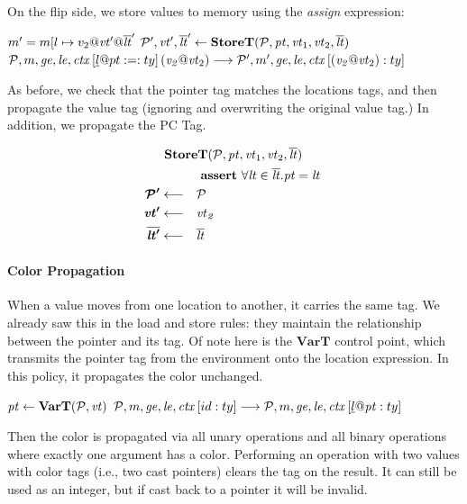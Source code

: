 \documentclass{article}
\begin{document}
On the flip side, we store values to memory using the {\it assign} expression:

                  {\(m' = m[l \mapsto v_2@\mathit{vt}' @\overline{\mathit{lt}}'\)}
                  {\(\mathcal{P}',\mathit{vt}',\overline{\mathit{lt}}' \leftarrow \mathbf{StoreT}(\mathcal{P},\mathit{pt},\mathit{vt}_1,\mathit{vt}_2,\overline{\mathit{lt}})\)}
                  {\(\mathcal{P}, m, \mathit{ge}, \mathit{le}, \mathit{ctx}\left[\underline{l}@pt := : ty\right]{(\mathit{v_2} @ \mathit{vt}_2)}
                    \longrightarrow
                    \mathcal{P}', m', \mathit{ge}, \mathit{le}, \mathit{ctx}\left[(\mathit{v_2} @ \mathit{vt}_2) : ty\right]\)}

As before, we check that the pointer tag matches the locations tags, and then propagate the
value tag (ignoring and overwriting the original value tag.) In addition, we propagate the PC Tag.
                  
\[\begin{aligned}
\truledef{\storet{\PCT}{\pt}{\vt_1}{\vt_2}{\overline{\lt}}}
\assert{\forall \lt \in \overline{\lt} . \pt = \lt}
\settag{\PCT'}{\PCT}
\settag{\vt'}{\vt_2}
\settag{\overline{\lt'}}{\overline{\lt}}
\end{aligned}\]

\paragraph*{Color Propagation}

When a value moves from one location to another, it carries the same tag.
We already saw this in the load and store rules: they maintain the relationship
between the pointer and its tag. Of note here is the \(\mathbf{VarT}\) control point,
which transmits the pointer tag from the environment onto the location expression.
In this policy, it propagates the color unchanged.

            {\(\mathit{pt} \leftarrow \mathbf{VarT}(\mathcal{P},\mathit{vt})\)}
            {\(\mathcal{P}, m, \mathit{ge}, \mathit{le}, \mathit{ctx}\left[id : ty\right]
              \longrightarrow
              \mathcal{P}, m, \mathit{ge}, \mathit{le}, \mathit{ctx}\left[\underline{l}@\mathit{pt} : ty\right]\)}


Then the color is propagated via all unary operations and all binary operations
where exactly one argument has a color. Performing an operation with two values
with color tags (i.e., two cast pointers) clears the tag on the result. It can still
be used as an integer, but if cast back to a pointer it will be invalid.
\end{document}
